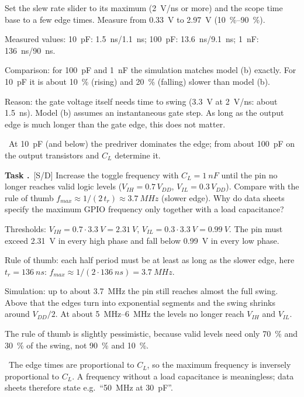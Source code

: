\documentclass[a4paper,11pt]{article}
\newcounter{task}[section]
\renewcommand{\thetask}{\thesection.\arabic{task}}
\newcommand{\task}[1]{\par\medskip\refstepcounter{task}%
  {\sffamily\bfseries\color{rwuviolet}Task \thetask}\ {\sffamily\small\color{rwucyandark}[#1]}\quad}
\newenvironment{solution}{\begin{solbox}}{\end{solbox}}
\newcommand{\answer}{\par\smallskip{\sffamily\bfseries\color{rwuviolet}Answer:}\ }
\begin{document}
\begin{solution}
\begin{steps}
  \item Set the slew rate slider to its maximum (\SI{2}{V/ns} or more) and the scope time base to a few edge
        times. Measure from \SI{0.33}{V} to \SI{2.97}{V} (\SIrange{10}{90}{\percent}).
  \item Measured values: \SI{10}{pF}: \SI{1.5}{ns}/\SI{1.1}{ns}; \SI{100}{pF}: \SI{13.6}{ns}/\SI{9.1}{ns};
        \SI{1}{nF}: \SI{136}{ns}/\SI{90}{ns}.
  \item Comparison: for \SI{100}{pF} and \SI{1}{nF} the simulation matches model (b) exactly. For \SI{10}{pF}
        it is about \SI{10}{\percent} (rising) and \SI{20}{\percent} (falling) slower than model (b).
  \item Reason: the gate voltage itself needs time to swing (\SI{3.3}{V} at \SI{2}{V/ns}: about \SI{1.5}{ns}).
        Model (b) assumes an instantaneous gate step. As long as the output edge is much longer than the gate
        edge, this does not matter.
\end{steps}
\answer At \SI{10}{pF} (and below) the predriver dominates the edge; from about \SI{100}{pF} on the output
transistors and $C_L$ determine it.
\end{solution}

\task{S/D} Increase the toggle frequency with $C_L=\SI{1}{nF}$ until the pin no longer reaches valid logic levels
($V_{IH}=0.7\,V_{DD}$, $V_{IL}=0.3\,V_{DD}$). Compare with the rule of thumb $f_{max}\approx 1/(2\,t_r)\approx
\SI{3.7}{MHz}$ (slower edge). Why do data sheets specify the maximum GPIO frequency only together with a load
capacitance?

\begin{solution}
\begin{steps}
  \item Thresholds: $V_{IH}=0.7\cdot\SI{3.3}{V}=\SI{2.31}{V}$, $V_{IL}=0.3\cdot\SI{3.3}{V}=\SI{0.99}{V}$. The
        pin must exceed \SI{2.31}{V} in every high phase and fall below \SI{0.99}{V} in every low phase.
  \item Rule of thumb: each half period must be at least as long as the slower edge, here $t_r=\SI{136}{ns}$:
        $f_{max}\approx1/(2\cdot\SI{136}{ns})=\SI{3.7}{MHz}$.
  \item Simulation: up to about \SI{3.7}{MHz} the pin still reaches almost the full swing. Above that the edges
        turn into exponential segments and the swing shrinks around $V_{DD}/2$. At about \SIrange{5}{6}{MHz}
        the levels no longer reach $V_{IH}$ and $V_{IL}$.
  \item The rule of thumb is slightly pessimistic, because valid levels need only \SI{70}{\percent} and
        \SI{30}{\percent} of the swing, not \SI{90}{\percent} and \SI{10}{\percent}.
\end{steps}
\answer The edge times are proportional to $C_L$, so the maximum frequency is inversely proportional to $C_L$.
A frequency without a load capacitance is meaningless; data sheets therefore state e.g.\ ``\SI{50}{MHz} at
\SI{30}{pF}''.
\end{solution}
\end{document}
